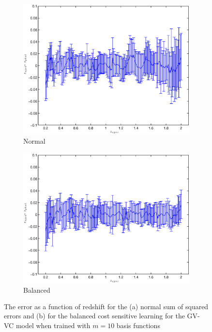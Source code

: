 \documentclass[useAMS,usenatbib,fleqn]{mn2e}
\begin{document}
\begin{figure}
        \centering
        \begin{subfigure}[b]{\columnwidth}
                \includegraphics[width=\textwidth]{figures/Zspec-Zphot_normal.eps}
                \caption{Normal}
                \label{fig-normal}
        \end{subfigure}
	
        \begin{subfigure}[b]{\columnwidth}
                \includegraphics[width=\textwidth]{figures/Zspec-Zphot_balanced.eps}
                \caption{Balanced}
                \label{fig-balanced}
        \end{subfigure}
        
       \caption{The error as a function of redshift for the (a) normal sum of squared errors and (b) for the balanced cost sensitive learning for the GV-VC model when trained with $m=10$ basis functions}
	\label{fig-normal-balanced}
\end{figure}
\end{document}
